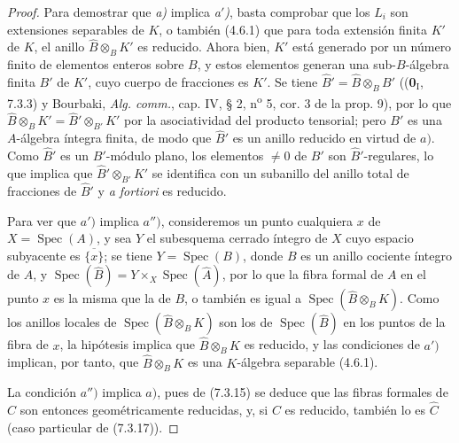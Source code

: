 \begin{proof}
Para demostrar que \emph{a)} implica \emph{a$'$)}, basta comprobar que los $L_i$
son extensiones separables de $K$, o también (4.6.1) que para toda
extensión finita $K'$ de $K$, el anillo $\widehat B\otimes_BK'$ es
reducido. Ahora bien, $K'$ está generado por un número finito de
elementos enteros sobre $B$, y estos elementos generan una
sub-$B$-álgebra finita $B'$ de $K'$, cuyo cuerpo de fracciones es
$K'$. Se tiene $\widehat{B}'=\widehat B\otimes_BB'$
((\textbf 0$_{\mathrm I}$, 7.3.3) y Bourbaki, \emph{Alg. comm.}, cap. IV, § 2,
n\textsuperscript{o} 5, cor. 3 de
la prop. 9), por lo que
$\widehat B\otimes_BK'=\widehat{B}'\otimes_{B'}K'$ por la
asociatividad del producto tensorial; pero $B'$ es una $A$-álgebra
íntegra finita, de modo que $\widehat{B}'$ es un anillo reducido
en virtud de $a)$. Como $\widehat{B}'$ es un $B'$-módulo plano,
los elementos $\neq0$ de $B'$ son $\widehat{B}'$-regulares, lo que
implica que $\widehat{B}'\otimes_{B'}K'$ se identifica con un
subanillo del anillo total de fracciones de $\widehat{B}'$ y
\emph{a fortiori} es reducido.

Para ver que $a')$ implica $a'')$, consideremos un punto cualquiera
$x$ de $X=\operatorname{Spec}(A)$, y sea $Y$ el subesquema cerrado
íntegro de $X$ cuyo espacio subyacente es $\overline{\{x\}}$;
se tiene $Y=\operatorname{Spec}(B)$, donde $B$ es un anillo
cociente íntegro de $A$, y
$\operatorname{Spec}(\widehat B)=Y\times_X\operatorname{Spec}(\widehat A)$,
por lo que la fibra formal de $A$ en el punto $x$ es la misma que
la de $B$, o también es igual a
$\operatorname{Spec}(\widehat B\otimes_BK)$. Como los anillos
locales de $\operatorname{Spec}(\widehat B\otimes_BK)$ son los
de $\operatorname{Spec}(\widehat B)$ en los puntos de la fibra
de $x$, la hipótesis implica que $\widehat B\otimes_BK$ es
reducido, y las condiciones de $a')$ implican, por tanto, que
$\widehat B\otimes_BK$ es una $K$-álgebra separable (4.6.1).

La condición $a'')$ implica $a)$, pues de (7.3.15) se deduce que
las fibras formales de $C$ son entonces geométricamente reducidas,
y, si $C$ es reducido, también lo es $\widehat C$ (caso
particular de (7.3.17)).


\end{proof}
